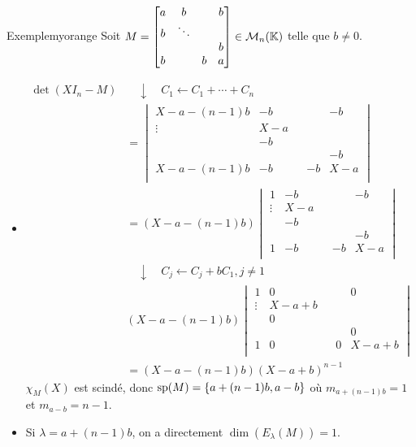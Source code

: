     \begin{omed}{Exemple}{myorange}
        Soit $M = \begin{bmatrix}
            a & b & & b \\
            b & \ddots & &  \\
            & & & b \\
            b & & b & a
        \end{bmatrix} \in \mk{n}$ telle que $b \neq 0$.
        \begin{itemize}
            \item \begin{align*}
                \det(X I_n - M) 
                &\quad \downarrow \quad C_1 \leftarrow C_1 + \cdots + C_n \\
                &= \begin{vmatrix}
                    X - a - (n-1)b & -b & & & -b \\
                    \vdots & X - a & & & \\
                    & -b & & &  \\
                    &  & & & - b \\
                    X- a - (n-1)b & -b & & -b & X - a \\
                \end{vmatrix} \\
                &= (X - a - (n-1)b) \begin{vmatrix}
                    1 & -b & & & -b \\
                    \vdots & X - a & & & \\
                    & -b & & &  \\
                    &  & & & - b \\
                    1 & -b & & -b & X - a \\
                \end{vmatrix} \\
                & \quad \downarrow \quad C_j \leftarrow C_j + b C_1, j \neq 1 \\
                & (X -a - (n-1)b) \begin{vmatrix}
                    1 & 0 & & & 0 \\
                    \vdots & X - a + b & & & \\
                    & 0 & & &  \\
                    &  & & & 0 \\
                    1 & 0 & & 0 & X - a  + b\\
                \end{vmatrix} \\ 
                &= (X - a - (n-1)b) (X - a + b)^{n-1}
            \end{align*}
            $\chi_M(X)$ est scindé, donc $\sp(M) = \left\{a + (n-1)b, a - b\right\}$ où $m_{a + (n-1)b} = 1$ et $m_{a-b} = n-1$. 
            \item Si $\lambda = a + (n-1)b$, on a directement $\dim(E_{\lambda}(M)) = 1$.
            

\end{itemize}
\end{omed}
